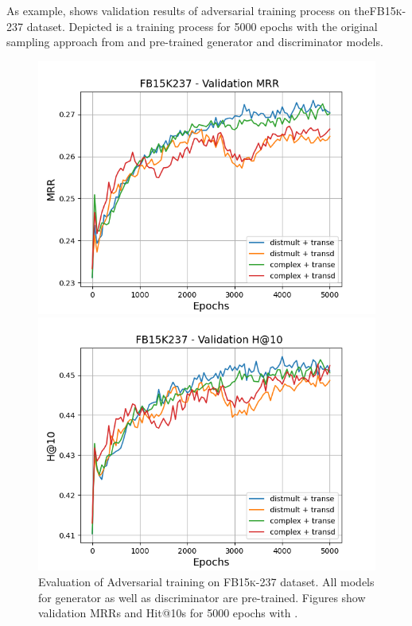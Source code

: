 As example,  shows validation results of adversarial training process on the\textsc{FB15k-237} dataset.
Depicted is a training process for 5000 epochs with the original sampling approach from \kbgan and pre-trained generator and discriminator models.
\begin{figure}[H]
    \centering
    \begin{minipage}{.5\textwidth}
      \centering
      \includegraphics[width=0.9\linewidth]{figures/results/gan_train/pretrained/random/fb15k237/gan_train_random_fb15k237_mrrs.png}
    \end{minipage}%
    \begin{minipage}{.5\textwidth}
      \centering
      \includegraphics[width=0.9\linewidth]{figures/results/gan_train/pretrained/random/fb15k237/gan_train_random_fb15k237_hit10s.png}
    \end{minipage}
    \caption{Evaluation of Adversarial training on \textsc{FB15k-237} dataset.
    All models for generator as well as discriminator are pre-trained.
    Figures show validation MRRs and Hit@10s for 5000 epochs with \origsampling.}
    \label{fig:original_pretrained_advtrain}
\end{figure}
